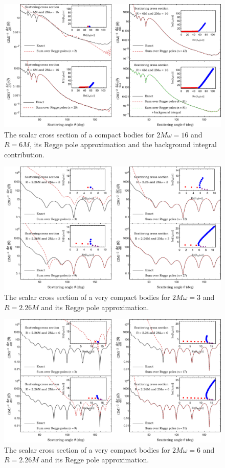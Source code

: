 \documentclass[aps,prd,longbibliography,reprint,twocolumn,amsmath,amssymb,amsfonts,showpacs,superscriptaddress]{revtex4-1}%
\begin{document}
\begin{figure}%
 \includegraphics[scale=0.50]{Scattering_Cross_Section_R_6_2Mw_16}
\caption{\label{S_0_2Mw_01_Exact_vs_CAM} The scalar cross section of a compact bodies for $2M\omega=16$ and $R=6M$, its Regge pole approximation and the background integral contribution.}
\end{figure}

\begin{figure}%
\centering
 \includegraphics[scale=0.50]{Scattering_Cross_Section_R_2-dot-26_2Mw_3}
\caption{\label{S_0_2Mw_06_Exact_vs_CAM} The scalar cross section of a very compact bodies for $2M\omega=3$ and $R=2.26M$ and its Regge pole approximation.}
\end{figure}


\begin{figure}%
\centering
 \includegraphics[scale=0.50]{Scattering_Cross_Section_R_2-dot-26_2Mw_6}
\caption{\label{S_0_2Mw_06_Exact_vs_CAM} The scalar cross section of a very compact bodies for $2M\omega=6$ and $R=2.26M$ and its Regge pole approximation.}
\end{figure}
\end{document}
